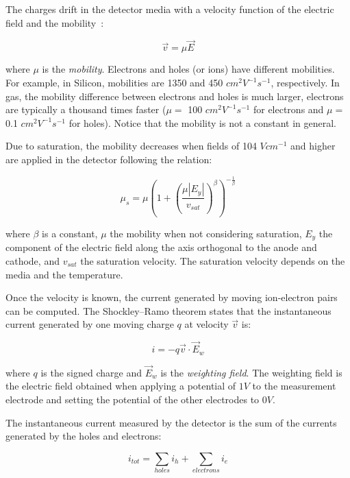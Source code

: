 \documentclass[11pt]{article}
\begin{document}
	The charges drift in the detector media with a velocity function of the electric
	field and the mobility~\cite{spieler2005semiconductor}:

	\begin{equation}
		\vec{v} = \mu \vec{E}
		\label{eq:charge_speed}
	\end{equation}

	where $\mu$ is the \textit{mobility}. Electrons and holes (or ions) have different
	mobilities. For example, in Silicon, mobilities are 1350 and 450 $cm^2V^{-1}s^{-1}$,
	respectively. In gas, the mobility difference between electrons and holes is
	much larger, electrons are typically a thousand times faster ($\mu =$ 100 $cm^2V^{-1}s^{-1}$
	for electrons and $\mu =$ 0.1 $cm^2V^{-1}s^{-1}$ for holes). Notice that the mobility
	is not a constant in general.

	Due to saturation, the mobility decreases when fields of 104 $V cm^{-1}$ and higher are applied in
	the detector following the relation:

	\begin{equation}
		\mu_s = \mu \left (1 + \left (\frac{\mu |E_y|}{v_{sat}} \right )^{\beta} \right )^{-\frac{1}{\beta}}
		\label{eq:saturation}
	\end{equation}

	where $\beta$ is a constant, $\mu$ the mobility when not considering saturation,
	$E_y$ the component of the electric field along the axis orthogonal to the anode and cathode,
	and $v_{sat}$ the saturation velocity. The saturation velocity depends on the
	media and the temperature.

	Once the velocity is known, the current generated by moving ion-electron
	pairs can be computed. The Shockley–Ramo theorem states that the instantaneous current generated
	by one moving charge $q$ at velocity $\vec{v}$ is:

	\begin{equation}
		i = -q \vec{v} \cdot \vec{E}_w
		\label{eq:ramo}
	\end{equation}

	where $q$ is the signed charge and $\vec{E}_w$ is the \textit{weighting field}. The weighting field is the electric field
	obtained when applying a potential of $1V$ to the measurement electrode and setting
	the potential of the other electrodes to $0V$.

	The instantaneous current measured
	by the detector is the sum of the currents generated by the holes and electrons:

	\begin{equation}
		i_{tot} = \sum_{holes} i_h + \sum_{electrons} i_e
		\label{eq:tot_current}
	\end{equation}
\end{document}
